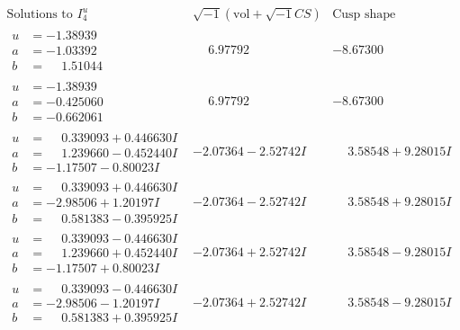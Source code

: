 \documentclass[1p]{elsarticle_modified}
\theoremstyle{definition}
\newcommand{\I}{\sqrt{-1}}
\begin{document}
$$\begin{array}{c|c|c}  
\text{Solutions to }I^u_{4}& \I (\text{vol} + \sqrt{-1}CS) & \text{Cusp shape}\\
 \hline 
\begin{aligned}
u &= -1.38939\phantom{ +0.000000I} \\
a &= -1.03392\phantom{ +0.000000I} \\
b &= \phantom{-}1.51044\phantom{ +0.000000I}\end{aligned}
 & \phantom{-}6.97792\phantom{ +0.000000I} & -8.67300\phantom{ +0.000000I} \\ \hline\begin{aligned}
u &= -1.38939\phantom{ +0.000000I} \\
a &= -0.425060\phantom{ +0.000000I} \\
b &= -0.662061\phantom{ +0.000000I}\end{aligned}
 & \phantom{-}6.97792\phantom{ +0.000000I} & -8.67300\phantom{ +0.000000I} \\ \hline\begin{aligned}
u &= \phantom{-}0.339093 + 0.446630 I \\
a &= \phantom{-}1.239660 - 0.452440 I \\
b &= -1.17507 - 0.80023 I\end{aligned}
 & -2.07364 - 2.52742 I & \phantom{-}3.58548 + 9.28015 I \\ \hline\begin{aligned}
u &= \phantom{-}0.339093 + 0.446630 I \\
a &= -2.98506 + 1.20197 I \\
b &= \phantom{-}0.581383 - 0.395925 I\end{aligned}
 & -2.07364 - 2.52742 I & \phantom{-}3.58548 + 9.28015 I \\ \hline\begin{aligned}
u &= \phantom{-}0.339093 - 0.446630 I \\
a &= \phantom{-}1.239660 + 0.452440 I \\
b &= -1.17507 + 0.80023 I\end{aligned}
 & -2.07364 + 2.52742 I & \phantom{-}3.58548 - 9.28015 I \\ \hline\begin{aligned}
u &= \phantom{-}0.339093 - 0.446630 I \\
a &= -2.98506 - 1.20197 I \\
b &= \phantom{-}0.581383 + 0.395925 I\end{aligned}
 & -2.07364 + 2.52742 I & \phantom{-}3.58548 - 9.28015 I \\ \hline\begin{aligned}

\end{aligned}
\end{array}$$
\end{document}
